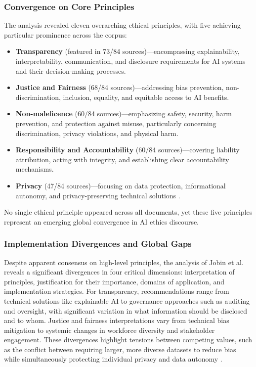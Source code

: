 \documentclass[twoside]{ai_ethics_class}
\begin{document}
\subsubsection{Convergence on Core Principles}

The analysis revealed eleven overarching ethical principles, with five achieving particular prominence across the corpus:
\begin{itemize}
\item \textbf{Transparency} (featured in 73/84 sources)—encompassing explainability, interpretability, communication, and disclosure requirements for AI systems and their decision-making processes.
\item \textbf{Justice and Fairness} (68/84 sources)—addressing bias prevention, non-discrimination, inclusion, equality, and equitable access to AI benefits.
\item \textbf{Non-maleficence} (60/84 sources)—emphasizing safety, security, harm prevention, and protection against misuse, particularly concerning discrimination, privacy violations, and physical harm.
\item \textbf{Responsibility and Accountability} (60/84 sources)—covering liability attribution, acting with integrity, and establishing clear accountability mechanisms.
\item \textbf{Privacy} (47/84 sources)—focusing on data protection, informational autonomy, and privacy-preserving technical solutions \cite{jobin2019global}.
\end{itemize}

No single ethical principle appeared across all documents, yet these five principles represent an emerging global convergence in AI ethics discourse.

\subsubsection{Implementation Divergences and Global Gaps}

Despite apparent consensus on high-level principles, the analysis of Jobin et al. \cite{jobin2019global} reveals a significant divergences in four critical dimensions: interpretation of principles, justification for their importance, domains of application, and implementation strategies.
For transparency, recommendations range from technical solutions like explainable AI to governance approaches such as auditing and oversight, with significant variation in what information should be disclosed and to whom.
Justice and fairness interpretations vary from technical bias mitigation to systemic changes in workforce diversity and stakeholder engagement.
These divergences highlight tensions between competing values, such as the conflict between requiring larger, more diverse datasets to reduce bias while simultaneously protecting individual privacy and data autonomy \cite{jobin2019global}.
\end{document}
